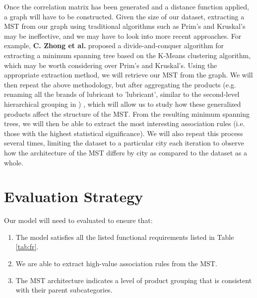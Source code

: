\documentclass[a4paper,11pt]{article}
\begin{document}
Once the correlation matrix has been generated and a distance function applied, a graph will have to be constructed.  Given the size of our dataset, extracting a MST from our graph using traditional algorithms such as Prim's and Kruskal's may be ineffective, and we may have to look into more recent approaches. For example,  \textbf{C. Zhong et al.} \cite{kmeans_mst} proposed a divide-and-conquer algorithm for extracting a minimum spanning tree based on the K-Means clustering algorithm, which may be worth considering over Prim's and Kruskal's.  Using the appropriate extraction method, we will retrieve our MST from the graph. We will then repeat the above methodology, but after aggregating the products (e.g.  renaming all the brands of lubricant to 'lubricant', similar to the second-level hierarchical grouping in \cite{market_ass}) ,  which will allow us to study how these generalized products affect the structure of the MST. From the resulting minimum spanning trees,  we will then be able to extract the most interesting association rules (i.e. those with the highest statistical significance).  We will also repeat this process several times,  limiting the dataset to a particular city each iteration to observe how the architecture of the MST differs by city as compared to the dataset as a whole.

\newpage
\section{Evaluation Strategy}
Our model will need to evaluated to ensure that:
\begin{enumerate}
\item The model satisfies all the listed functional requirements listed in Table \ref{tab:fr}.
\item We are able to extract high-value association rules from the MST.
\item The MST architecture indicates a level of product grouping that is consistent with their parent subcategories.
\end{enumerate}
\end{document}
